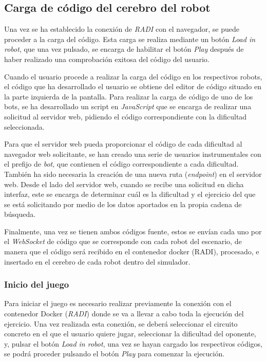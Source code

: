 \documentclass[a4paper, 12pt]{book}
\begin{document}
\subsection{Carga de código del cerebro del robot}
\label{follow_line_game_code_load}

Una vez se ha establecido la conexión de \emph{RADI} con el navegador, se puede proceder a la carga del código. Esta carga se realiza mediante un botón \emph{Load in robot}, que una vez pulsado, se encarga de habilitar el botón \emph{Play} después de haber realizado una comprobación exitosa del código del usuario.

Cuando el usuario procede a realizar la carga del código en los respectivos robots, el código que ha desarrollado el usuario
se obtiene del editor de código situado en la parte izquierda de la pantalla. Para realizar la carga de código de uno de los bots, se ha desarrollado un script en \emph{JavaScript} que se encarga de realizar una solicitud al servidor web, pidiendo el código correspondiente con la dificultad seleccionada.

Para que el servidor web pueda proporcionar el código de cada dificultad al navegador web solicitante, se han creado una serie de usuarios instrumentales con el prefijo de \emph{bot}, que contienen el código correspondiente a cada dificultad. También ha sido necesaria la creación de una nueva ruta (\emph{endpoint}) en el servidor web. Desde el lado del servidor web, cuando se recibe una solicitud en dicha interfaz, este se encarga de determinar cuál es la dificultad y el ejercicio del que se está solicitando por medio de los datos aportados en la propia cadena de búsqueda.

Finalmente, una vez se tienen ambos códigos fuente, estos se envían cada uno por el \emph{WebSocket} de código que se corresponde con cada robot del escenario, de manera que el código será recibido en el contenedor docker (RADI), procesado, e insertado en el cerebro de cada robot dentro del simulador. 

\subsubsection{Inicio del juego}
\label{subsec:follow_line_game_inicio}

Para iniciar el juego es necesario realizar previamente la conexión con el contenedor Docker (\emph{RADI}) donde se va a llevar a cabo toda la ejecución del ejercicio. Una vez realizada esta conexión, se deberá seleccionar el circuito concreto en el que el usuario quiere jugar, seleccionar la dificultad del oponente, y, pulsar el botón \emph{Load in robot}, una vez se hayan cargado los respectivos códigos, se podrá proceder pulsando el botón \emph{Play} para comenzar la ejecución.
\end{document}
